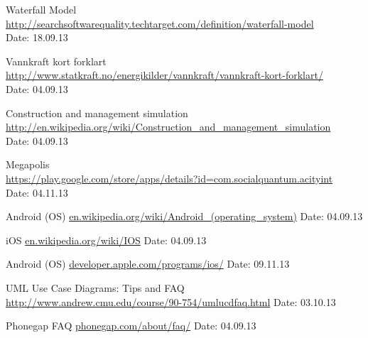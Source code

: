 \begin{thebibliography}{99}
	Waterfall Model \\
	\href {http://searchsoftwarequality.techtarget.com/definition/waterfall-model}{http://searchsoftwarequality.techtarget.com/definition/waterfall-model} \\
	Date: 18.09.13

	Vannkraft kort forklart \\
	\href {http://www.statkraft.no/energikilder/vannkraft/vannkraft-kort-forklart/}{http://www.statkraft.no/energikilder/vannkraft/vannkraft-kort-forklart/} \\
	Date: 04.09.13

	Construction and management simulation \\
	\href {http://en.wikipedia.org/wiki/Construction_and_management_simulation}{http://en.wikipedia.org/wiki/Construction\_and\_management\_simulation} \\
	Date: 04.09.13

	Megapolis \\
	\href {https://play.google.com/store/apps/details?id=com.socialquantum.acityint}{https://play.google.com/store/apps/details?id=com.socialquantum.acityint} \\
	Date: 04.11.13

	Android (OS)\newline
	\href {http://en.wikipedia.org/wiki/Android\_(operating_system)}{en.wikipedia.org/wiki/Android\_(operating\_system)}\newline
	Date: 04.09.13

	iOS\newline
	\href {http://en.wikipedia.org/wiki/IOS}{en.wikipedia.org/wiki/IOS}\newline
	Date: 04.09.13

	Android (OS)\newline
	\href {https://developer.apple.com/programs/ios/}{developer.apple.com/programs/ios/}\newline
	Date: 09.11.13

	UML Use Case Diagrams: Tips and FAQ
	\href {http://www.andrew.cmu.edu/course/90-754/umlucdfaq.html}{http://www.andrew.cmu.edu/course/90-754/umlucdfaq.html}
	Date: 03.10.13

	Phonegap FAQ\newline
	\href {http://phonegap.com/about/faq/}{phonegap.com/about/faq/}\newline
	Date: 04.09.13


\end{thebibliography}
